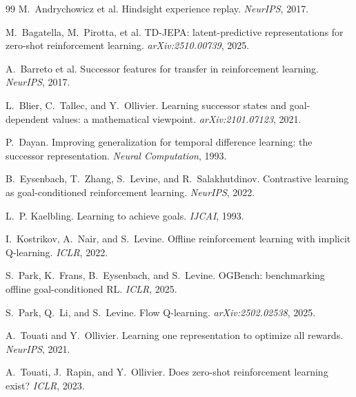 \documentclass[10pt]{article}
\begin{document}
\begin{thebibliography}{99}\small
{}
M.~Andrychowicz et al.
\newblock Hindsight experience replay.
\newblock \emph{NeurIPS}, 2017.

M.~Bagatella, M.~Pirotta, et al.
\newblock TD-JEPA: latent-predictive representations for zero-shot reinforcement learning.
\newblock \emph{arXiv:2510.00739}, 2025.

A.~Barreto et al.
\newblock Successor features for transfer in reinforcement learning.
\newblock \emph{NeurIPS}, 2017.

L.~Blier, C.~Tallec, and Y.~Ollivier.
\newblock Learning successor states and goal-dependent values: a mathematical viewpoint.
\newblock \emph{arXiv:2101.07123}, 2021.

P.~Dayan.
\newblock Improving generalization for temporal difference learning: the successor representation.
\newblock \emph{Neural Computation}, 1993.

B.~Eysenbach, T.~Zhang, S.~Levine, and R.~Salakhutdinov.
\newblock Contrastive learning as goal-conditioned reinforcement learning.
\newblock \emph{NeurIPS}, 2022.

L.~P. Kaelbling.
\newblock Learning to achieve goals.
\newblock \emph{IJCAI}, 1993.

I.~Kostrikov, A.~Nair, and S.~Levine.
\newblock Offline reinforcement learning with implicit Q-learning.
\newblock \emph{ICLR}, 2022.

S.~Park, K.~Frans, B.~Eysenbach, and S.~Levine.
\newblock OGBench: benchmarking offline goal-conditioned RL.
\newblock \emph{ICLR}, 2025.

S.~Park, Q.~Li, and S.~Levine.
\newblock Flow Q-learning.
\newblock \emph{arXiv:2502.02538}, 2025.

A.~Touati and Y.~Ollivier.
\newblock Learning one representation to optimize all rewards.
\newblock \emph{NeurIPS}, 2021.

A.~Touati, J.~Rapin, and Y.~Ollivier.
\newblock Does zero-shot reinforcement learning exist?
\newblock \emph{ICLR}, 2023.
\end{thebibliography}
\end{document}
